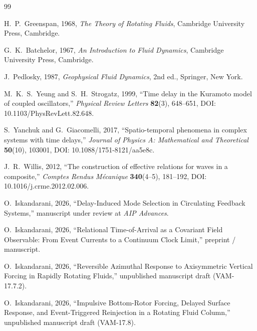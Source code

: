 \documentclass[11pt,a4paper]{article}
\begin{document}
\begin{thebibliography}{99}

H.~P.~Greenspan,
1968,
\emph{The Theory of Rotating Fluids},
Cambridge University Press, Cambridge.

G.~K.~Batchelor,
1967,
\emph{An Introduction to Fluid Dynamics},
Cambridge University Press, Cambridge.

J.~Pedlosky,
1987,
\emph{Geophysical Fluid Dynamics},
2nd ed.,
Springer, New York.

M.~K.~S.~Yeung and S.~H.~Strogatz,
1999,
``Time delay in the Kuramoto model of coupled oscillators,''
\emph{Physical Review Letters}
\textbf{82}(3), 648--651,
DOI: 10.1103/PhysRevLett.82.648.

S.~Yanchuk and G.~Giacomelli,
2017,
``Spatio-temporal phenomena in complex systems with time delays,''
\emph{Journal of Physics A: Mathematical and Theoretical}
\textbf{50}(10), 103001,
DOI: 10.1088/1751-8121/aa5e8c.

J.~R.~Willis,
2012,
``The construction of effective relations for waves in a composite,''
\emph{Comptes Rendus M\'ecanique}
\textbf{340}(4--5), 181--192,
DOI: 10.1016/j.crme.2012.02.006.

O.~Iskandarani,
2026,
``Delay-Induced Mode Selection in Circulating Feedback Systems,''
manuscript under review at \emph{AIP Advances}.

O.~Iskandarani,
2026,
``Relational Time-of-Arrival as a Covariant Field Observable: From Event Currents to a Continuum Clock Limit,''
preprint / manuscript.

O.~Iskandarani,
2026,
``Reversible Azimuthal Response to Axisymmetric Vertical Forcing in Rapidly Rotating Fluids,''
unpublished manuscript draft (VAM-17.7.2).

O.~Iskandarani,
2026,
``Impulsive Bottom-Rotor Forcing, Delayed Surface Response, and Event-Triggered Reinjection in a Rotating Fluid Column,''
unpublished manuscript draft (VAM-17.8).

\end{thebibliography}
\end{document}
